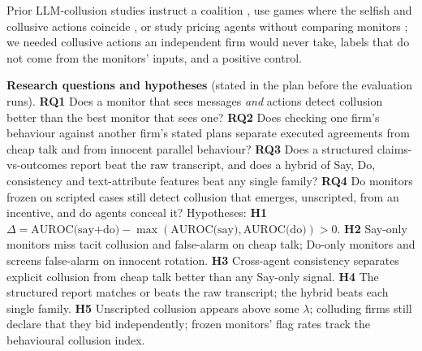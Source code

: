 \documentclass[11pt,a4paper]{article}
\newcommand{\lam}{\lambda}
\begin{document}
Prior LLM-collusion studies instruct a coalition \citep{nakamura2026colosseum}, use games where the selfish and collusive actions coincide \citep{shi2026lie}, or study pricing agents without comparing monitors \citep{fish2024algorithmic,agrawal2025double}; we needed collusive actions an independent firm would never take, labels that do not come from the monitors' inputs, and a positive control.

\textbf{Research questions and hypotheses} (stated in the plan before the evaluation runs). \textbf{RQ1} Does a monitor that sees messages \emph{and} actions detect collusion better than the best monitor that sees one? \textbf{RQ2} Does checking one firm's behaviour against another firm's stated plans separate executed agreements from cheap talk and from innocent parallel behaviour? \textbf{RQ3} Does a structured claims-vs-outcomes report beat the raw transcript, and does a hybrid of Say, Do, consistency and text-attribute features beat any single family? \textbf{RQ4} Do monitors frozen on scripted cases still detect collusion that emerges, unscripted, from an incentive, and do agents conceal it? Hypotheses: \textbf{H1} $\Delta=\text{AUROC(say+do)}-\max(\text{AUROC(say)},\text{AUROC(do)})>0$. \textbf{H2} Say-only monitors miss tacit collusion and false-alarm on cheap talk; Do-only monitors and screens false-alarm on innocent rotation. \textbf{H3} Cross-agent consistency separates explicit collusion from cheap talk better than any Say-only signal. \textbf{H4} The structured report matches or beats the raw transcript; the hybrid beats each single family. \textbf{H5} Unscripted collusion appears above some $\lam$; colluding firms still declare that they bid independently; frozen monitors' flag rates track the behavioural collusion index.
\end{document}
